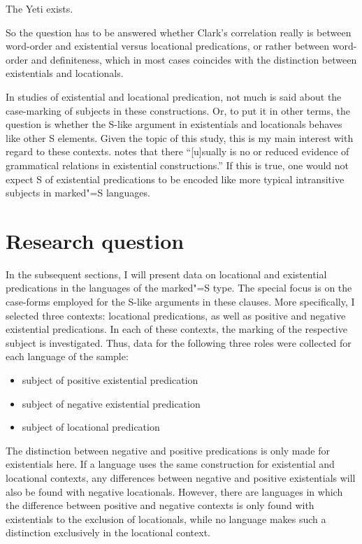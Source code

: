 \begin{exe}\ex\label{Yeti}The Yeti exists.
\end{exe} 

So the question has to be answered whether Clark's correlation really is between word-order and existential versus locational predications, or rather between word-order and definiteness, which in most cases coincides with the distinction between existentials and locationals.

In studies of existential and locational predication, not much is said about the case-marking of subjects in these constructions. 
Or, to put it in other terms, the question is whether the S-like argument in existentials and locationals behaves like other S elements. 
Given the topic of this study, this is my main interest with regard to these contexts.
\citet[123]{Payne:1997} notes that there ``[u]sually is no or reduced evidence of grammatical relations in existential constructions.''
If this is true, one would not expect S of existential predications to be encoded like more typical intransitive subjects in marked"=S languages.  


\section{Research question}\label{dataexist}

In the subsequent sections, I will present data on locational and existential predications in the languages of the marked"=S type. 
The special focus is on the case-forms employed for the S-like arguments in these clauses. 
More specifically, I selected three contexts: locational predications, as well as positive and negative existential predications. 
In each of these contexts, the marking of the respective subject is investigated. Thus, data for the following three roles were collected for each language of the sample:

\begin{itemize}
\item subject of positive existential predication
\item subject of negative existential predication
\item subject of locational predication
\end{itemize}

The distinction between negative and positive predications is only made for existentials here.
If a language uses the same construction for existential and locational contexts, any differences between negative and positive existentials will also be found with negative locationals. 
However, there are languages in which the difference between positive and negative contexts is only found with existentials to the exclusion of locationals, while no language makes such a distinction exclusively in the locational context. %

